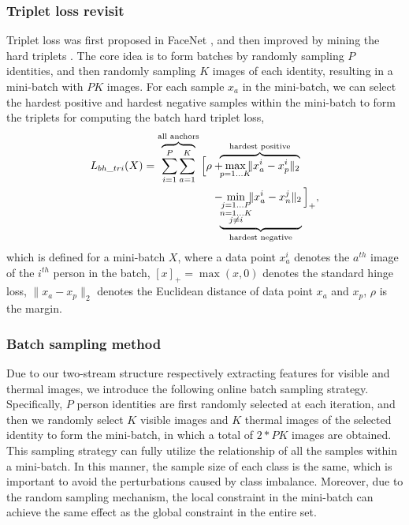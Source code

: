 \documentclass[journal]{IEEEtran}
\begin{document}
\subsubsection{Triplet loss revisit}
Triplet loss was first proposed in FaceNet \cite{schroff2015facenet}, and then improved by mining the hard triplets \cite{hermans2017defense}. The core idea is to form batches by randomly sampling $P$ identities, and then randomly sampling $K$ images of each identity, resulting in a mini-batch with $PK$ images. For each sample $x_a$ in the mini-batch, we can select the hardest positive and hardest negative samples within the mini-batch to form the triplets for computing the batch hard triplet loss,
\begin{align}\label{eq:loss_bh}
    L_{bh\_tri}(X) = \overbrace{\sum\limits_{i=1}^{P} \sum\limits_{a=1}^{K}}^{\textnormal{all anchors}}
        \Big[\rho & + \hspace*{-5pt} \overbrace{\max\limits_{p=1 \dots K} \hspace*{-5pt} \|x^i_a - x^i_p\|_2 }^{\textnormal{hardest positive}} \\
               & - \hspace*{-5pt} \underbrace{\min\limits_{\substack{j=1 \dots P \\ n=1 \dots K \\ j \neq i}} \hspace*{-5pt} \| x^i_a - x^j_n \| _2}_{\textnormal{hardest negative}} \Big]_+,\nonumber
\end{align}
which is defined for a mini-batch $X$, where a data point $x_a^i$ denotes the $a^{th}$ image of the $i^{th}$ person in the batch, $[x]_{+} = \max(x, 0)$ denotes the standard hinge loss, $\| x_a - x_p \|_2$ denotes the Euclidean distance of data point $x_a$ and $x_p$, $\rho$ is the margin.

\subsubsection{Batch sampling method} Due to our two-stream structure respectively extracting features for visible and thermal images, we introduce the following online batch sampling strategy. Specifically, $P$ person identities are first randomly selected at each iteration, and then we randomly select $K$ visible images and $K$ thermal images of the selected identity to form the mini-batch, in which a total of $2*PK$ images are obtained. This sampling strategy can fully utilize the relationship of all the samples within a mini-batch. In this manner, the sample size of each class is the same, which is important to avoid the perturbations caused by class imbalance. Moreover, due to the random sampling mechanism, the local constraint in the mini-batch can achieve the same effect as the global constraint in the entire set.
\end{document}
